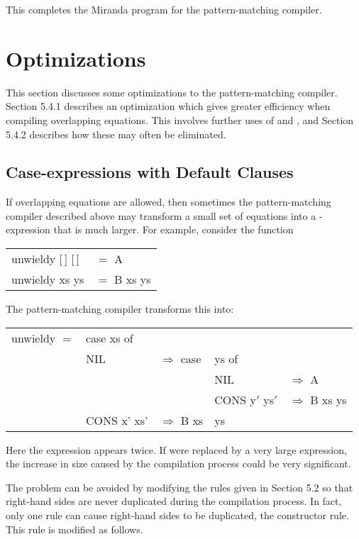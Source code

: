 This completes the Miranda program for the pattern-matching compiler.

\section{Optimizations}
This section discusses some optimizations to the pattern-matching compiler. Section 5.4.1 describes an optimization which gives greater efficiency when
compiling overlapping equations. This involves further uses of \fatbar{} and , and
Section 5.4.2 describes how these may often be eliminated.

\subsection{Case-expressions with Default Clauses}
If overlapping equations are allowed, then sometimes the pattern-matching compiler described above may transform a small set of equations into a -expression that is much larger. For example, consider the function
\begin{mlcoded}
\begin{tabular}{ll}
    unwieldy [\,] [\,] &$=$ A \\
    unwieldy xs ys &$=$ B xs ys
\end{tabular}
\end{mlcoded}
The pattern-matching compiler transforms this into:
\begin{mlcoded}
\setlength{\tabcolsep}{0.2em}
\begin{tabular}{lllll}
    unwieldy $=$ \tlb{xs}\tlb{ys}&case xs of &&& \\
    &NIL &$\Rightarrow$ case& ys of & \\
    &&&NIL &$\Rightarrow$ A \\
    &&&CONS y$'$ ys$'$ &$\Rightarrow$ B xs ys\\
    &CONS x' xs' &$\Rightarrow$ B xs& ys
\end{tabular}
\end{mlcoded}
Here the expression  appears twice. If  were replaced by
a very large expression, the increase in size caused by the compilation process
could be very significant.

The problem can be avoided by modifying the rules given in Section 5.2 so
that right-hand sides are never duplicated during the compilation process. In
fact, only one rule can cause right-hand sides to be duplicated, the constructor
rule. This rule is modified as follows.

